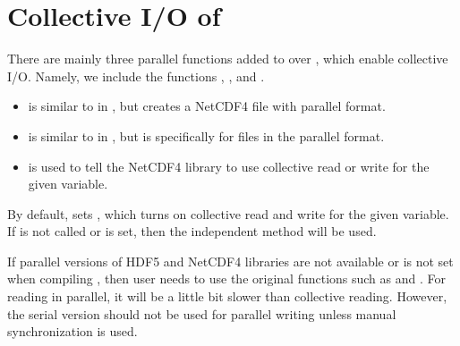 
\section[Collective I/O of \pkg{pbdNCDF4}]{Collective I/O of }
\label{sec:collective}

There are mainly three parallel functions added to  over , which
enable collective I/O.  Namely, we include the  functions ,
, and .
\begin{itemize}
\item {} is similar to  in ,
but creates a NetCDF4 file with parallel format.

\item {} is similar to  in ,
but is specifically for files in the parallel format.

\item {} is used to tell the NetCDF4 library to use
collective read or write for the given variable.
\end{itemize}

By default,  sets , which
turns on collective read and write for the given variable.
If  is not called or  is set,
then the independent method will be used.

If parallel versions of HDF5 and NetCDF4 libraries are not available
or \code{-} is not set when compiling ,
then user needs to use the original  functions such as
 and .
For reading in parallel, it will be a little bit slower than collective reading.
However, the serial version should not be used for parallel writing
unless manual synchronization is used.

